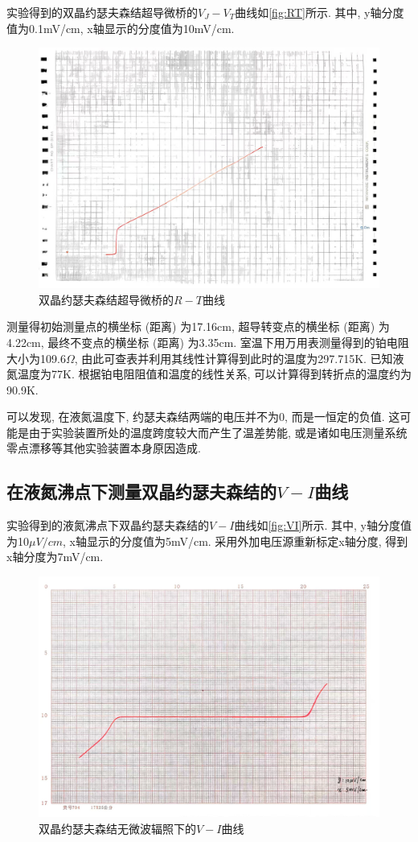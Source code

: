 \documentclass[font=default]{mpltx}
\begin{document}
  实验得到的双晶约瑟夫森结超导微桥的$V_J-V_T$曲线如\autoref{fig:RT}所示. 其中, y轴分度值为0.1mV/cm, x轴显示的分度值为10mV/cm.
  \begin{figure}[htbp]
    \centering
    \includegraphics[width=0.85\linewidth]{fig/3.jpg}
    \caption{双晶约瑟夫森结超导微桥的$R-T$曲线}
    \label{fig:RT}
  \end{figure}

  测量得初始测量点的横坐标 (距离) 为17.16cm, 超导转变点的横坐标 (距离) 为4.22cm, 最终不变点的横坐标 (距离) 为3.35cm.
  室温下用万用表测量得到的铂电阻大小为109.6$\Omega$, 由此可查表并利用其线性计算得到此时的温度为297.715K.
  已知液氮温度为77K. 根据铂电阻阻值和温度的线性关系, 可以计算得到转折点的温度约为90.9K. 

  \par
  可以发现, 在液氮温度下, 约瑟夫森结两端的电压并不为0, 而是一恒定的负值. 这可能是由于实验装置所处的温度跨度较大而产生了温差势能, 或是诸如电压测量系统零点漂移等其他实验装置本身原因造成.


  \subsection{在液氮沸点下测量双晶约瑟夫森结的$V-I$曲线}
  实验得到的液氮沸点下双晶约瑟夫森结的$V-I$曲线如\autoref{fig:VI}所示. 其中, y轴分度值为10$\mu V/cm$, x轴显示的分度值为5mV/cm.
  采用外加电压源重新标定x轴分度, 得到x轴分度为7mV/cm.
   \begin{figure}[htbp]
    \centering
    \includegraphics[width=0.85\linewidth]{fig/4.jpg}
    \caption{双晶约瑟夫森结无微波辐照下的$V-I$曲线}
    \label{fig:VI}
  \end{figure}
\end{document}
